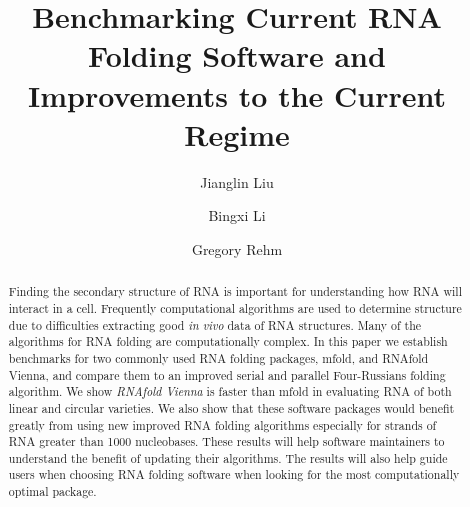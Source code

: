 \documentclass[12pt]{article}
\title{Benchmarking Current RNA Folding Software and Improvements to the Current Regime}
\begin{document}
\author{Jianglin Liu}
\author{Bingxi Li}
\author{Gregory Rehm}
\maketitle

\begin{abstract}
Finding the secondary structure of RNA is important for understanding how RNA
will interact in a cell. Frequently computational algorithms are used to determine
structure due to difficulties extracting good \textit{in vivo} data of RNA
structures. Many of the algorithms for RNA folding are computationally complex.
In this paper we establish benchmarks for two commonly used RNA folding packages,
mfold, and RNAfold Vienna, and compare them to an improved serial and parallel Four-Russians folding
algorithm. We show \textit{RNAfold Vienna} is faster than mfold in evaluating RNA
of both linear and circular varieties. We also show that these software
packages would benefit greatly from using new improved RNA folding algorithms especially for strands
of RNA greater than 1000 nucleobases. These results will help software maintainers to understand
the benefit of updating their algorithms. The results will also help guide users
when choosing RNA folding software when looking for the most computationally optimal package.
\end{abstract}
\end{document}
